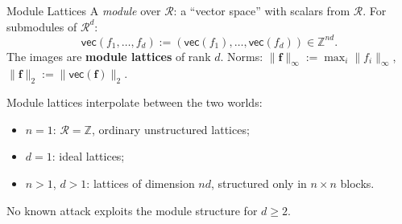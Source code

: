 \documentclass{zkdl-presentation-template}
\begin{document}
    \begin{frame}{Module Lattices}
        A \emph{module} over $\mathcal{R}$: a ``vector space'' with scalars from $\mathcal{R}$. For submodules of $\mathcal{R}^d$:
        \begin{equation*}
            \mathsf{vec}(f_1,\dots,f_d) := (\mathsf{vec}(f_1),\dots,\mathsf{vec}(f_d)) \in \mathbb{Z}^{nd}.
        \end{equation*}
        The images are \textbf{module lattices} of rank $d$. Norms: $\|\mathbf{f}\|_{\infty} := \max_i \|f_i\|_{\infty}$, $\|\mathbf{f}\|_2 := \|\mathsf{vec}(\mathbf{f})\|_2$.
        \pause

        Module lattices interpolate between the two worlds:
        \begin{itemize}
            \item $n = 1$: $\mathcal{R} = \mathbb{Z}$, ordinary unstructured lattices;\pause
            \item $d = 1$: ideal lattices;\pause
            \item $n > 1$, $d > 1$: lattices of dimension $nd$, structured only in $n \times n$ blocks.
        \end{itemize}
        \pause

        \begin{remark}
            No known attack exploits the module structure for $d \geq 2$.
        \end{remark}
    \end{frame}
\end{document}
